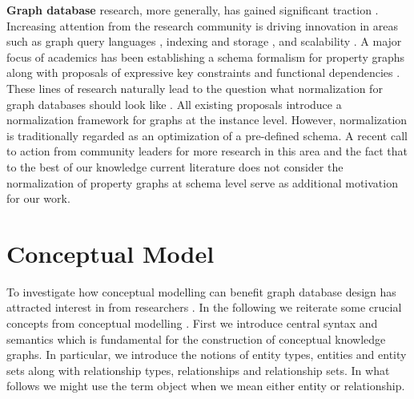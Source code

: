 \documentclass[sigconf]{acmart}
\begin{document}
\textbf{Graph database} research, more generally, has gained significant traction \cite{Sakr_21_Future_is_Big_Graphs}. Increasing attention from the research community is driving innovation in areas such as graph query languages \cite{Deutsch_22_Graph_Pattern_Matching_GQL_SQL/PGQ}, indexing and storage \cite{Shi_24_Space_Saving_Structure_for_Dynamic_Graph_Storage}, and scalability \cite{Mo_25_LSM_Scalable_Graph_DB}. A major focus of academics has been establishing a schema formalism for property graphs \cite{Angles_23_PG_Schema, LDBC_20_PG_Schema_Working_Group, Bonifati_19_Schema_Validation_for_Graph_DBs} along with proposals of expressive key constraints \cite{Angles_21_PG_Keys, Fan_15_Graph_Keys} and functional dependencies \cite{Fan_16_Graph_FDs, Fan_20_Discovering_Graph_FDs}. These lines of research naturally lead to the question what normalization for graph databases should look like \cite{Skavantzos_25_Graph_3NF_BCNF, Egger_26_Structural_Normalization_of_PGs, Schrott_27_Graph_Native_Normalization}. All existing proposals introduce a normalization framework for graphs at the instance level. However, normalization is traditionally regarded as an optimization of a pre-defined schema. A recent call to action from community leaders for more research in this area \cite{Kondylakis_25_PG_Standards_SOTA_and_Challenges} and the fact that to the best of our knowledge current literature does not consider the normalization of property graphs at schema level serve as additional motivation for our work.













\section{Conceptual Model}\label{sec:er-model}

To investigate how conceptual modelling can benefit graph database design has attracted interest in from researchers \cite{Daniel_16_UML_To_Graph, Pokorny_16_Conceptual_Modeling_Graph_DB, DBLP:conf/iiwas/SousaC18,DBLP:conf/er/VirgilioMT14, Skavantzos_25_ER_Graphs}. In the following we reiterate some crucial concepts from conceptual modelling \cite{Thalheim_00_ERM}. First we introduce central syntax and semantics which is fundamental for the construction of conceptual knowledge graphs. In particular, we introduce the notions of entity types, entities and entity sets along with relationship types, relationships and relationship sets. In what follows we might use the term object when we mean either entity or relationship.
\end{document}
